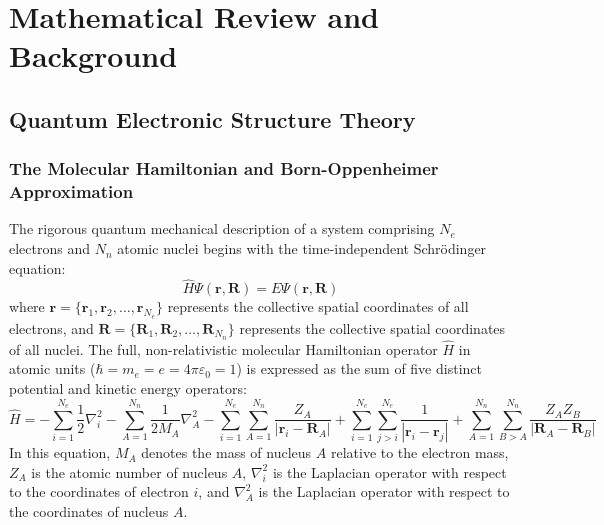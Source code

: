 \documentclass[12pt]{article}
\begin{document}
\section{Mathematical Review and Background}

\subsection{Quantum Electronic Structure Theory}

\subsubsection{The Molecular Hamiltonian and Born-Oppenheimer Approximation}

The rigorous quantum mechanical description of a system comprising $N_e$ electrons and $N_n$ atomic nuclei begins with the time-independent Schrödinger equation:
\begin{equation}
\hat{H} \Psi(\mathbf{r}, \mathbf{R}) = E \Psi(\mathbf{r}, \mathbf{R})
\end{equation}
where $\mathbf{r} = \{\mathbf{r}_1, \mathbf{r}_2, \dots, \mathbf{r}_{N_e}\}$ represents the collective spatial coordinates of all electrons, and $\mathbf{R} = \{\mathbf{R}_1, \mathbf{R}_2, \dots, \mathbf{R}_{N_n}\}$ represents the collective spatial coordinates of all nuclei. The full, non-relativistic molecular Hamiltonian operator $\hat{H}$ in atomic units ($\hbar = m_e = e = 4\pi\varepsilon_0 = 1$) is expressed as the sum of five distinct potential and kinetic energy operators:
\begin{equation}
\hat{H} = -\sum_{i=1}^{N_e} \frac{1}{2} \nabla_i^2 - \sum_{A=1}^{N_n} \frac{1}{2 M_A} \nabla_A^2 - \sum_{i=1}^{N_e} \sum_{A=1}^{N_n} \frac{Z_A}{|\mathbf{r}_i - \mathbf{R}_A|} + \sum_{i=1}^{N_e} \sum_{j>i}^{N_e} \frac{1}{|\mathbf{r}_i - \mathbf{r}_j|} + \sum_{A=1}^{N_n} \sum_{B>A}^{N_n} \frac{Z_A Z_B}{|\mathbf{R}_A - \mathbf{R}_B|}
\end{equation}
In this equation, $M_A$ denotes the mass of nucleus $A$ relative to the electron mass, $Z_A$ is the atomic number of nucleus $A$, $\nabla_i^2$ is the Laplacian operator with respect to the coordinates of electron $i$, and $\nabla_A^2$ is the Laplacian operator with respect to the coordinates of nucleus $A$.
\end{document}
